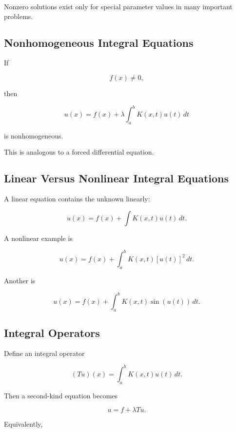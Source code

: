 Nonzero solutions exist only for special parameter values in many
important problems.

\subsection{Nonhomogeneous Integral Equations}
\label{subsec:nonhomogeneous-integral-equations}

If

\[
f(x)\neq0,
\]

then

\[
\boxed{
u(x)
=
f(x)
+
\lambda
\int_a^b
K(x,t)u(t)\,dt
}
\]

is nonhomogeneous.

This is analogous to a forced differential equation.

\subsection{Linear Versus Nonlinear Integral Equations}
\label{subsec:linear-versus-nonlinear-integral-equations}

A linear equation contains the unknown linearly:

\[
\boxed{
u(x)
=
f(x)
+
\int
K(x,t)u(t)\,dt.
}
\]

A nonlinear example is

\[
\boxed{
u(x)
=
f(x)
+
\int_a^b
K(x,t)
[u(t)]^2
\,dt.
}
\]

Another is

\[
\boxed{
u(x)
=
f(x)
+
\int_a^b
K(x,t)
\sin(u(t))
\,dt.
}
\]

\subsection{Integral Operators}
\label{subsec:integral-operators}

Define an integral operator

\[
\boxed{
(Tu)(x)
=
\int_a^b
K(x,t)u(t)\,dt.
}
\]

Then a second-kind equation becomes

\[
\boxed{
u
=
f+\lambda Tu.
}
\]

Equivalently,

